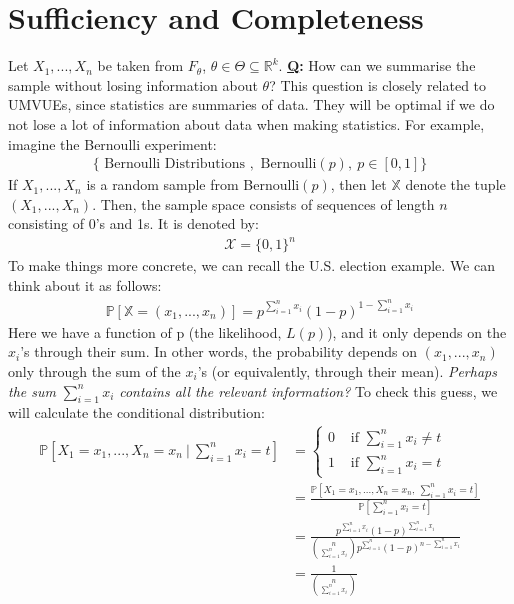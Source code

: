 \documentclass[11pt]{scrartcl}
\newcommand{\R}[0]{\mathbb{R}}
\theoremstyle{definition}
\theoremstyle{remark}
\newcommand{\pr}[1]{\mathbb{P}\left[#1 \right]}
\begin{document}
{\section{Sufficiency and Completeness} 
Let $X_1, ..., X_n$ be taken from $F_\theta$, $\theta \in \Theta \subseteq \R^k$. \textbf{\underline{Q}:} How can we summarise the sample without losing information about $\theta$? This question is closely related to UMVUEs, since statistics are summaries of data. They will be optimal if we do not lose a lot of information about data when making statistics. For example, imagine the Bernoulli experiment:
\begin{align*}
	\{ \text{ Bernoulli Distributions }, \text{ Bernoulli}(p),\ p \in [0,1] \} 
\end{align*}
If $X_1, ..., X_n$ is a random sample from Bernoulli$(p)$, then let $\mathbb{X}$ denote the tuple $(X_1, ..., X_n)$. Then, the sample space consists of sequences of length $n$ consisting of 0's and 1s. It is denoted by: 
\begin{align*}
	\mathcal{X} = \{ 0, 1 \}^n 
\end{align*}
To make things more concrete, we can recall the U.S. election example. We can think about it as follows: 
\begin{align*}
	\pr{ \mathbb{X} = (x_1, ..., x_n) } = p^{\sum_{i=1}^n x_i} (1-p)^{1- \sum_{i=1}^n x_i} 
\end{align*}
Here we have a function of p (the likelihood, $L(p)$), and it only depends on the $x_i$'s through their sum. In other words, the probability depends on $(x_1, ..., x_n)$ only through the sum of the $x_i$'s (or equivalently, through their mean). \emph{Perhaps the sum} $\sum_{i=1}^n x_i$ \emph{contains all the relevant information?} To check this guess, we will calculate the conditional distribution: 
\begin{align*}
	\pr{X_1 = x_1, ..., X_n = x_n\ |\ \sum_{i=1}^n x_i = t} & = \begin{cases}
			0 & \text{ if } \sum_{i=1}^n x_i \neq t \\
			1 & \text{ if } \sum_{i=1}^n x_i = t 
		\end{cases} \\
		& = \frac{\pr{X_1 = x_1, ..., X_n = x_n,\ \sum_{i=1}^n x_i = t}}{\pr{\sum_{i=1}^n x_i = t}} \\
		& = \frac{p^{\sum_{i=1}^n x_i} (1-p)^{\sum_{i=1}^n x_i}}{\binom{n}{\sum_{i=1}^n x_i} p^{\sum_{i=1}^n} (1-p)^{n-\sum_{i=1}^n x_i}} \\
		& = \frac{1}{\binom{n}{\sum_{i=1}^n x_i}}

\end{align*}}
\end{document}
